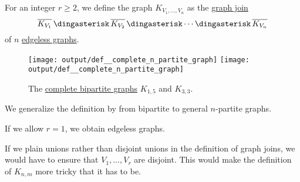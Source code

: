 \begin{definition}\label{def:complete_n_partite_graph}\mimprovised
  For an integer \( r \geq 2 \), we define the  graph \( K_{V_1,\ldots,V_n} \) as the \hyperref[def:graph_join]{graph join}
  \begin{equation*}
    \oline{K_{V_1}} \Ast \oline{K_{V_2}} \Ast \cdots \Ast \oline{K_{V_n}}
  \end{equation*}
  of \( n \) \hyperref[def:edgeless_graph]{edgeless graphs}.

  \begin{figure}[!ht]
    \hfill
    \texttt{[image: output/def\_\_complete\_n\_partite\_graph]}
    \hfill
    \texttt{[image: output/def\_\_complete\_n\_partite\_graph]}
    \hfill
    \hfill
    \caption{The \hyperref[def:complete_n_partite_graph]{complete bipartite graphs} \( K_{1,5} \) and \( K_{3,3} \).}\label{fig:def:complete_n_partite_graph}
  \end{figure}
\end{definition}
\begin{comments}
  \item We generalize the definition by  from bipartite to general \( n \)-partite graphs.
  \item If we allow \( r = 1 \), we obtain edgeless graphs.
  \item If we plain unions rather than disjoint unions in the definition of graph joins, we would have to ensure that \( V_1, \ldots, V_r \) are disjoint. This would make the definition of \( K_{n,m} \) more tricky that it has to be.
\end{comments}

